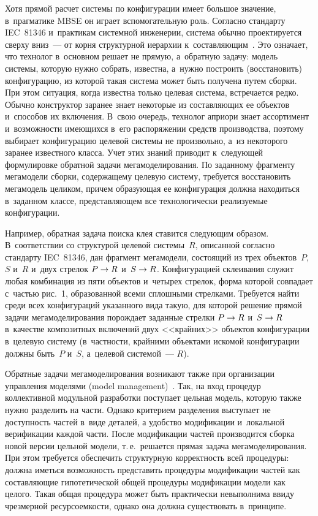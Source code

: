 \begin{multicols}{2}
   
   Хотя прямой расчет сис\-те\-мы по конфигурации имеет большое значение, 
в~прагматике MBSE он играет вспомогательную роль. Согласно стандарту 
IEC~81346 и~практикам сис\-тем\-ной инженерии, сис\-те\-ма обычно проектируется 
сверху вниз~--- от корня структурной иерархии к~составляющим~\cite{9-kov}. Это 
означает, что технолог в~основном решает не прямую, а~обратную задачу: 
модель сис\-те\-мы, которую нужно собрать, известна, а~нуж\-но по\-строить 
(восстановить) конфигурацию, из которой такая сис\-те\-ма может быть получена 
путем сборки. При этом ситуация, когда известна только целевая сис\-те\-ма, 
встречается редко. Обычно конструктор заранее знает некоторые из 
составляющих ее объектов и~способов их вклю\-че\-ния. В~свою очередь, 
технолог априори знает ассортимент и~возможности име\-ющих\-ся в~его 
распоряжении средств производства, поэтому выбирает конфигурацию целевой 
сис\-те\-мы не произвольно, а~из некоторого заранее известного класса. Учет этих 
знаний приводит к~следующей формулировке обратной задачи 
мегамоделирования. По заданному фрагменту мегамодели сборки, 
содержащему целевую си\-сте\-му, требуется восстановить мегамодель целиком, 
причем образующая ее конфигурация должна находиться в~заданном классе, 
пред\-став\-ля\-ющем все технологически реализуемые конфигурации.
   
   Например, обратная задача поиска клея ставится следующим образом. 
В~соответствии со струк\-турой целевой сис\-те\-мы~$R$, описанной согласно 
стандар\-ту IEC~81346, дан фрагмент мегамодели, состоящий из трех 
объектов~$P$, $S$ и~$R$ и~двух стрелок $P\hm\to R$ и~$S\hm\to R$. 
Конфигурацией склеивания служит любая комбинация из пяти объектов 
и~четырех стрелок, форма которой совпадает с~частью рис.~1, образованной 
всеми сплошными стрелками. Требуется найти среди всех конфигураций 
указанного вида такую, для которой решение прямой задачи 
мегамоделирования порождает заданные стрелки $P\hm\to R$ и~$S\hm\to R$ 
в~качестве композитных включений двух <<крайних>> объектов 
конфигурации в~целевую сис\-те\-му (в~част\-ности, крайними объектами искомой 
конфигурации должны быть~$P$ и~$S$, а~целевой сис\-те\-мой~--- $R$).
   
   Обратные задачи мегамоделирования возникают также при организации 
управления моделями (model management)~\cite{7-kov}. Так, на вход процедур 
коллективной модульной разработки поступает цельная модель, которую также 
нужно разделить на части. Однако критерием разделения выступает не 
доступность частей в~виде деталей, а удобство модификации и~локальной 
верификации каждой части. После модификации частей производится сборка 
новой версии цельной модели, т.\,е.\ решается прямая задача 
мегамоделирования. При этом требуется обеспечить структурную корректность 
всей процедуры: должна иметься возможность представить процедуры 
модификации частей как составляющие гипотетической общей процедуры 
модификации модели как целого. 
Такая общая процедура может быть 
практически невыполнима ввиду чрезмерной ре\-сур\-со\-ем\-кости, однако она 
должна существовать в~принципе. 


\end{multicols}

